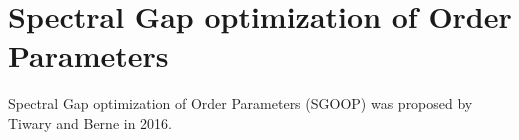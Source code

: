 \section{Spectral Gap optimization of Order Parameters\label{Sec:DR:SGOOP}}
Spectral Gap optimization of Order Parameters (SGOOP) was proposed by Tiwary and Berne in 2016.\cite{TiwaryPNAS2016}